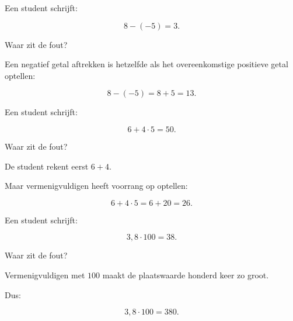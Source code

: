 \documentclass{ximera}
\begin{document}
\begin{oefening}{\oefU\ESS}
\begin{question}
\end{question}


\begin{question}

Een student schrijft:

\[
8-(-5)=3.
\]

Waar zit de fout?

\begin{oplossing}

Een negatief getal aftrekken is hetzelfde als het overeenkomstige positieve
getal optellen:

\[
8-(-5)
=
8+5
=
13.
\]

\end{oplossing}

\end{question}


\begin{question}

Een student schrijft:

\[
6+4\cdot5=50.
\]

Waar zit de fout?

\begin{oplossing}

De student rekent eerst \(6+4\).

Maar vermenigvuldigen heeft voorrang op optellen:

\[
6+4\cdot5
=
6+20
=
26.
\]

\end{oplossing}

\end{question}


\begin{question}

Een student schrijft:

\[
3{,}8\cdot100=38.
\]

Waar zit de fout?

\begin{oplossing}

Vermenigvuldigen met \(100\) maakt de plaatswaarde honderd keer zo groot.

Dus:

\[
3{,}8\cdot100=380.
\]

\end{oplossing}

\end{question}

\end{oefening}


\end{document}
